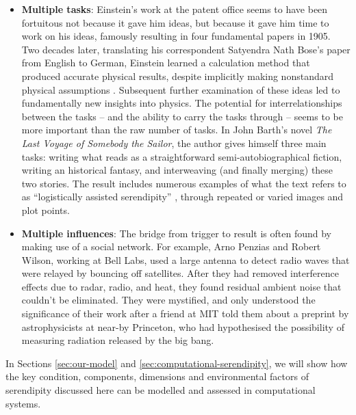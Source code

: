 \begin{itemize}
\item \textbf{Multiple tasks}: Einstein's work at the patent office
  seems to have been fortuitous not because it gave him ideas, but
  because it gave him time to work on his ideas, famously resulting in
  four fundamental papers in 1905.  Two decades later, translating his
  correspondent Satyendra Nath Bose's paper from English to German,
  Einstein learned a calculation method that produced accurate
  physical results, despite implicitly making nonstandard physical
  assumptions \cite{delbruck1980bose}.  Subsequent further examination
  of these ideas led to fundamentally new insights into physics.  The
  potential for interrelationships between the tasks -- and the
  ability to carry the tasks through -- seems to be more important
  than the raw number of tasks.  In John Barth's
  \citeyearpar{barth1992last} novel \emph{The Last Voyage of Somebody
    the Sailor}, the author gives himself three main tasks: writing
  what reads as a straightforward semi-autobiographical fiction,
  writing an historical fantasy, and interweaving (and finally
  merging) these two stories.  The result includes numerous examples
  of what the text refers to as ``logistically assisted serendipity''
  \cite[p.~311]{barth1992last}, through repeated or varied images and
  plot points.
\end{itemize}

\begin{itemize}
\item \textbf{Multiple influences}: The bridge from trigger to result
  is often found by making use of a social network.  For example, Arno
  Penzias and Robert Wilson, working at Bell Labs, used a large
  antenna to detect radio waves that were relayed by bouncing off 
  satellites.  After they had removed interference effects due to
  radar, radio, and heat, they found residual ambient noise that
  couldn't be eliminated.  They were mystified, and only understood
  the significance of their work after a friend at MIT told them about
  a preprint by astrophysicists at near-by Princeton, who had
  hypothesised the possibility of measuring radiation released by the
  big bang.
\end{itemize}

\noindent In Sections \ref{sec:our-model} and
\ref{sec:computational-serendipity}, we will show how the key
condition, components, dimensions and environmental factors of
serendipity discussed here can be modelled and assessed in
computational systems.

% 

